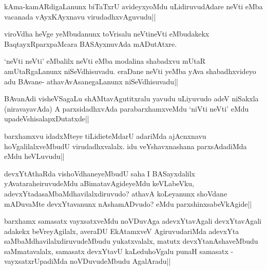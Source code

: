 \begin{artha}
kAma-kamARdigaLanunx biTaTxrU avideyxyoMdu uLidiruvudAdare neVti eMba vacanada vAyxKAyxnavu virudadhxvAguvudu||
\end{artha}

\begin{artha}
viroVdha heVge yeMbudanunx toVrisalu neVtineVti eMbudakekx BaqtayxRparxpaMcara BASAyxnuvAda mADutAtxre.
\end{artha}

\begin{artha}
`neVti neVti' eMbalilx neVti eMba modalina shabadxvu mUtaR amUtaRgaLanunx niSeVdhisuvadu. eraDane neVti yeMba yAva shabadhxvideyo adu BAvane- athavAvAsanegaLanunx niSeVdhisuvadu||
\end{artha}


\begin{artha}
BAvanAdi visheVSagaLu shAMtavAgutitxralu yavudu uLiyuvudo adeV niSakxla (niravayavAda) A parxsidadhxvAda parabarxhamxveMdu `niVti neVti' eMdu upadeVshisalapxDutatxde||
\end{artha}

\begin{artha}
barxhamxvu idadxMteye tiLidieteMdarU adariMda ajAcnxnavu hoVgalilalxveMbudU virudadhxvalalx. idu veYshavxnashana parxsAdadiMda eMdu heVLuvudu||
\end{artha}


\begin{artha}
devxYtAthaRda vishoVdhaneyeMbudU saha I BASayxdalilx yAvataraheiruvudeMdu aBimatavAgideyeMdu keVLabeVku, adevxYtadasaMbaMdhavilalxdiruvudo? athavA koLeyanunx shoVdane mADuvaMte devxYtavanunx nAshamADvudo? eMdu parxshinxsabeVkAgide||
\end{artha}


\begin{artha}
barxhamx samasatx vayxsatxveMdu noVDuvAga adevxYtavAgali devxYtavAgali adakekx beVreyAgilalx, averaDU EkAtamxveV AgiruvudariMda adevxYta saMbaMdhavilalxdiruvudeMbudu yukatxvalalx, matutx devxYtanAshaveMbudu saMmatavalalx, samasatx devxYtavU kaLeduhoVgalu punaH samasatx - vayxsatxrUpadiMda noVDuvudeMbudu AgalAradu||
\end{artha}


